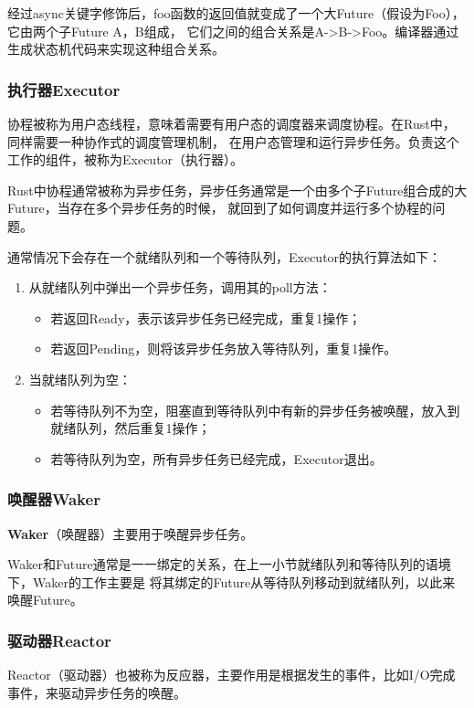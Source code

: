 \documentclass[supercite]{HustGraduPaper}
\theoremstyle{definition}
\begin{document}
经过async关键字修饰后，foo函数的返回值就变成了一个大Future（假设为Foo），它由两个子Future A，B组成，
它们之间的组合关系是A->B->Foo。编译器通过生成状态机代码来实现这种组合关系。\par

\subsubsection{执行器Executor}
协程被称为用户态线程，意味着需要有用户态的调度器来调度协程。在Rust中，同样需要一种协作式的调度管理机制，
在用户态管理和运行异步任务。负责这个工作的组件，被称为Executor（执行器）。\par

Rust中协程通常被称为异步任务，异步任务通常是一个由多个子Future组合成的大Future，当存在多个异步任务的时候，
就回到了如何调度并运行多个协程的问题。\par

通常情况下会存在一个就绪队列和一个等待队列，Executor的执行算法如下：
\begin{enumerate}
  \item 从就绪队列中弹出一个异步任务，调用其的poll方法：
    \begin{itemize}
      \item 若返回Ready，表示该异步任务已经完成，重复1操作；
      \item 若返回Pending，则将该异步任务放入等待队列，重复1操作。
    \end{itemize}
  \item 当就绪队列为空：
    \begin{itemize}
      \item 若等待队列不为空，阻塞直到等待队列中有新的异步任务被唤醒，放入到就绪队列，然后重复1操作；
      \item 若等待队列为空，所有异步任务已经完成，Executor退出。
    \end{itemize}
\end{enumerate}

\subsubsection{唤醒器Waker}
\textbf{Waker}（唤醒器）主要用于唤醒异步任务。\par

Waker和Future通常是一一绑定的关系，在上一小节就绪队列和等待队列的语境下，Waker的工作主要是
将其绑定的Future从等待队列移动到就绪队列，以此来唤醒Future。\par

\subsubsection{驱动器Reactor}
Reactor（驱动器）也被称为反应器，主要作用是根据发生的事件，比如I/O完成事件，来驱动异步任务的唤醒。\par
\end{document}

